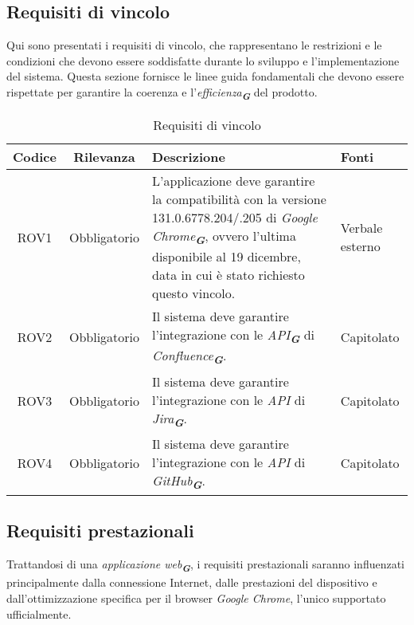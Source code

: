 \subsection{Requisiti di vincolo}
\label{sec:req_vincolo}
Qui sono presentati i requisiti di vincolo, che rappresentano le restrizioni e le condizioni
che devono essere soddisfatte durante lo sviluppo e l'implementazione del sistema. Questa
sezione fornisce le linee guida fondamentali che devono essere rispettate per garantire la
coerenza e l'\emph{efficienza}\textsubscript{\textit{\textbf{G}}} del prodotto.
\begin{table}[h!]
    \centering
    \renewcommand{\arraystretch}{1.6} %
    \begin{tabularx}{\textwidth}{|>{\centering\arraybackslash}c|>{\centering\arraybackslash}c|>{\centering\arraybackslash}X|>{\centering\arraybackslash}p{3cm}|} \hline
    \rowcolor[HTML]{FFD700} 
    \textbf{Codice} & \textbf{Rilevanza} & \textbf{Descrizione} & \textbf{Fonti} \\ \hline
	ROV1 & Obbligatorio & L'applicazione deve garantire la compatibilità con la versione 131.0.6778.204/.205 di \emph{Google Chrome}\textsubscript{\textit{\textbf{G}}}, ovvero l'ultima disponibile al 19 dicembre, data in cui è stato richiesto questo vincolo. & Verbale esterno \\ \hline
    ROV2 & Obbligatorio & Il sistema deve garantire l'integrazione con le \emph{API}\textsubscript{\textit{\textbf{G}}} di \emph{Confluence}\textsubscript{\textit{\textbf{G}}}. & Capitolato \\ \hline
    ROV3 & Obbligatorio & Il sistema deve garantire l'integrazione con le \emph{API} di \emph{Jira}\textsubscript{\textit{\textbf{G}}}. & Capitolato \\ \hline
    ROV4 & Obbligatorio & Il sistema deve garantire l'integrazione con le \emph{API} di \emph{GitHub}\textsubscript{\textit{\textbf{G}}}. & Capitolato \\ \hline
    \end{tabularx}
    \caption{Requisiti di vincolo}
    \label{tab:Requisiti_di_vincolo}
\end{table}

\subsection{Requisiti prestazionali}
\label{sec:req_prestazionali}
Trattandosi di una \emph{applicazione web}\textsubscript{\textit{\textbf{G}}}, i requisiti prestazionali saranno influenzati principalmente dalla connessione Internet, 
dalle prestazioni del dispositivo e dall'ottimizzazione specifica per il browser \emph{Google Chrome}, l'unico supportato ufficialmente.


